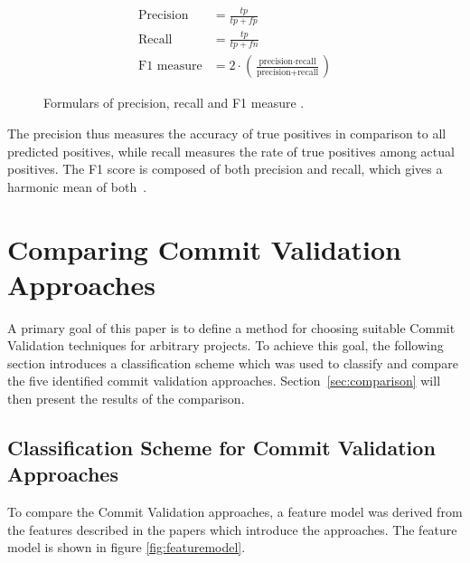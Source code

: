 \begin{figure}[t]
	\centering
	\begin{align*}
	\text{Precision} &= \frac{tp}{tp+fp}\\
	\text{Recall} &= \frac{tp}{tp+fn}\\
	\text{F1 measure} &= 2 \cdot \left( \frac{\text{precision} \cdot \text{recall}}{\text{precision} + \text{recall}} \right)
	\end{align*}
	\caption{Formulars of precision, recall and F1 measure \cite{Powers2007}.}
	\label{fig:formulas}
\end{figure}

The precision thus measures the accuracy of true positives in comparison to all predicted positives, while recall measures the rate of true positives among actual positives. The F1 score is composed of both precision and recall,
which gives a harmonic mean of both~\cite{Powers2007}.


\section{Comparing Commit Validation Approaches}
\label{sec:comparingapproaches}

A primary goal of this paper is to define a method for choosing suitable Commit Validation techniques for arbitrary projects. To achieve this goal, the following section introduces a classification scheme which was used to classify and compare the five identified commit validation approaches. Section~\ref{sec:comparison} will then present the results of the comparison.

\subsection{Classification Scheme for Commit Validation Approaches}
\label{sec:scheme}

To compare the Commit Validation approaches, a feature model was derived from the features described in the papers which introduce the approaches. The feature model is shown in figure \ref{fig:featuremodel}.

